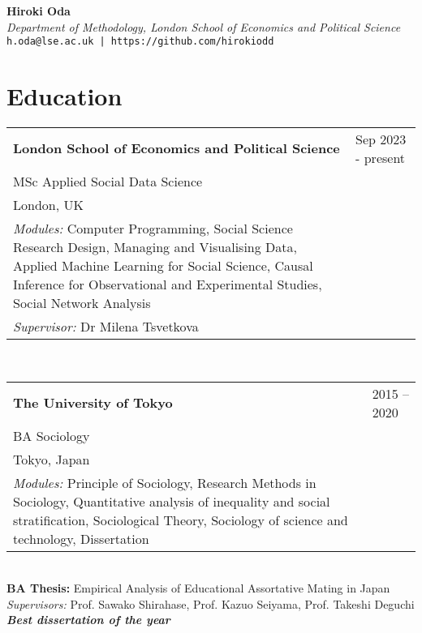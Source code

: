 \documentclass[11pt, a4paper]{article}
\begin{document}
\begin{center}
{\huge \textbf{Hiroki Oda}} \\
\vspace{5pt}
{\large \textit{Department of Methodology, London School of Economics and Political Science}} \\
\texttt{h.oda@lse.ac.uk | https://github.com/hirokiodd} \\
\end{center}


\section*{Education}
\noindent\begin{tabular}{@{}p{}p{}}
\textbf{London School of Economics and Political Science} & \hfill Sep 2023 - present \\
MSc Applied Social Data Science \\
London, UK \\
\textit{Modules:} Computer Programming, Social Science Research Design, Managing and Visualising Data, Applied Machine Learning for Social Science, Causal Inference for Observational and Experimental Studies, Social Network Analysis \\
\textit{Supervisor:} Dr Milena Tsvetkova\\
\end{tabular} \\

\noindent\begin{tabular}{@{}p{}p{}} \\
\textbf{The University of Tokyo} & \hfill 2015 -- 2020 \\
BA Sociology \\
Tokyo, Japan \\
\textit{Modules:} Principle of Sociology, Research Methods in Sociology, Quantitative analysis of inequality and social stratification, Sociological Theory, Sociology of science and technology, Dissertation \\
\end{tabular} \\

\noindent \textbf{BA Thesis:} Empirical Analysis of Educational Assortative Mating in Japan \\
\textit{Supervisors:} Prof. Sawako Shirahase, Prof. Kazuo Seiyama, Prof. Takeshi Deguchi \\
\textit{\textbf{Best dissertation of the year}} \\
\end{document}
